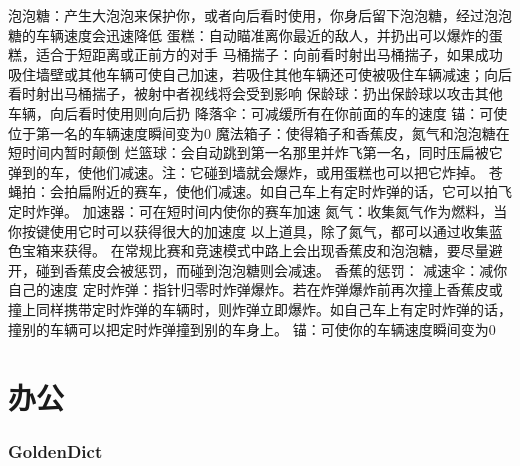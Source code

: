 \documentclass[paper=a4,fontsize=11pt]{article}
\begin{document}
	\noindent 泡泡糖：产生大泡泡来保护你，或者向后看时使用，你身后留下泡泡糖，经过泡泡糖的车辆速度会迅速降低\newline
	蛋糕：自动瞄准离你最近的敌人，并扔出可以爆炸的蛋糕，适合于短距离或正前方的对手\newline
	马桶揣子：向前看时射出马桶揣子，如果成功吸住墙壁或其他车辆可使自己加速，若吸住其他车辆还可使被吸住车辆减速；向后看时射出马桶揣子，被射中者视线将会受到影响\newline
	保龄球：扔出保龄球以攻击其他车辆，向后看时使用则向后扔\newline
	降落伞：可减缓所有在你前面的车的速度\newline
	锚：可使位于第一名的车辆速度瞬间变为0\newline
	魔法箱子：使得箱子和香蕉皮，氮气和泡泡糖在短时间内暂时颠倒\newline
	烂篮球：会自动跳到第一名那里并炸飞第一名，同时压扁被它弹到的车，使他们减速。注：它碰到墙就会爆炸，或用蛋糕也可以把它炸掉。\newline
	苍蝇拍：会拍扁附近的赛车，使他们减速。如自己车上有定时炸弹的话，它可以拍飞定时炸弹。\newline
	加速器：可在短时间内使你的赛车加速\newline
	氮气：收集氮气作为燃料，当你按键使用它时可以获得很大的加速度\newline
	以上道具，除了氮气，都可以通过收集蓝色宝箱来获得。\newline
	在常规比赛和竞速模式中路上会出现香蕉皮和泡泡糖，要尽量避开，碰到香蕉皮会被惩罚，而碰到泡泡糖则会减速。\newline
	香蕉的惩罚：\newline
	减速伞：减你自己的速度\newline
	定时炸弹：指针归零时炸弹爆炸。若在炸弹爆炸前再次撞上香蕉皮或撞上同样携带定时炸弹的车辆时，则炸弹立即爆炸。如自己车上有定时炸弹的话，撞别的车辆可以把定时炸弹撞到别的车身上。\newline
	锚：可使你的车辆速度瞬间变为0
	
	\clearpage
		
	\part{办公}
	
	\clearpage
	
	\section{GoldenDict}
	
\end{document}
